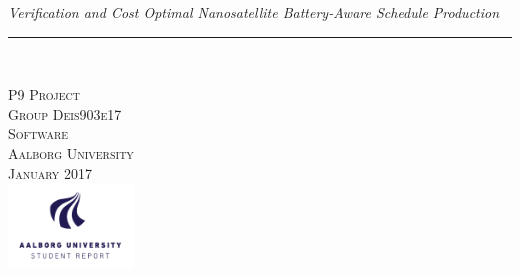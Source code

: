 \thispagestyle{empty}
\begin{flushright}
\vspace{3cm}

\phantom{hul}

\phantom{hul}

\phantom{hul}

\textsl{\Huge Verification and Cost Optimal Nanosatellite Battery-Aware Schedule Production} \\ \vspace{1cm}

\rule{13cm}{3mm} \\ %
\end{flushright}

\begin{flushright}
\vspace{2cm}
\textsc{\Large P9 Project \\
Group Deis903e17 \\
Software\\
Aalborg University\\
 January 2017\\
\includegraphics[width=0.25\textwidth]{graphics/AAU-logo-stud-UK-RGB.pdf}}
\end{flushright}
